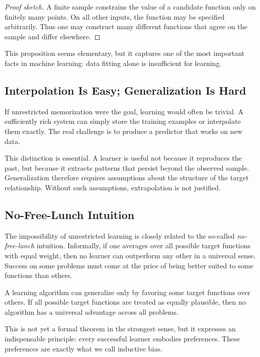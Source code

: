 \begin{proof}[Proof sketch]
A finite sample constrains the value of a candidate function only on finitely many points. On all other inputs, the function may be specified arbitrarily. Thus one may construct many different functions that agree on the sample and differ elsewhere.
\end{proof}

This proposition seems elementary, but it captures one of the most important facts in machine learning: data fitting alone is insufficient for learning.

\subsection{Interpolation Is Easy; Generalization Is Hard}

If unrestricted memorization were the goal, learning would often be trivial. A sufficiently rich system can simply store the training examples or interpolate them exactly. The real challenge is to produce a predictor that works on new data.

This distinction is essential. A learner is useful not because it reproduces the past, but because it extracts patterns that persist beyond the observed sample. Generalization therefore requires assumptions about the structure of the target relationship. Without such assumptions, extrapolation is not justified.

\subsection{No-Free-Lunch Intuition}

The impossibility of unrestricted learning is closely related to the so-called \emph{no-free-lunch} intuition. Informally, if one averages over all possible target functions with equal weight, then no learner can outperform any other in a universal sense. Success on some problems must come at the price of being better suited to some functions than others.

\begin{statement}
A learning algorithm can generalize only by favoring some target functions over others. If all possible target functions are treated as equally plausible, then no algorithm has a universal advantage across all problems.
\end{statement}

This is not yet a formal theorem in the strongest sense, but it expresses an indispensable principle: every successful learner embodies preferences. These preferences are exactly what we call inductive bias.


